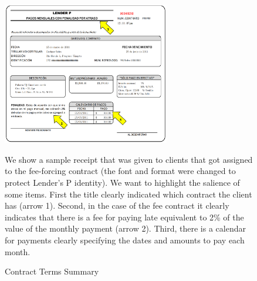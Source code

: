 \documentclass[oneside,11pt]{article}
\begin{document}
\begin{figure}[H]
     \caption{Contract Terms Summary}
    \label{PaperSlip}
    \begin{center}
        \includegraphics[width=0.65\textwidth]{Figuras/TicketLenderP.png}
    
    \end{center}
    \scriptsize
        We show a sample receipt that was given to clients that got assigned to the fee-forcing contract (the font and format were changed to protect Lender's P identity). We want to highlight the salience of some items. First the title clearly indicated which contract the client has (arrow 1). Second, in the case of the fee contract it clearly indicates that there is a fee for paying late equivalent to 2\% of the value of the monthly payment (arrow 2). Third, there is a calendar for payments clearly specifying the dates and amounts to pay each month. %
\end{figure}
\end{document}
